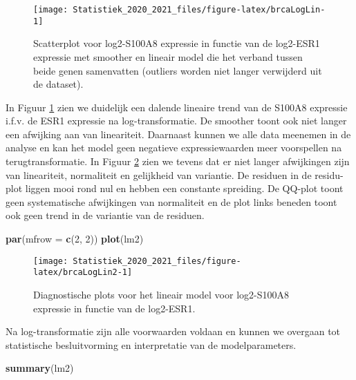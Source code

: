 \documentclass[
  12pt,dutch,coursenotes]{book}
\newenvironment{Shaded}{\begin{snugshade}}{\end{snugshade}}
\newcommand{\DataTypeTok}[1]{\textcolor[rgb]{0.13,0.29,0.53}{#1}}
\newcommand{\DecValTok}[1]{\textcolor[rgb]{0.00,0.00,0.81}{#1}}
\newcommand{\KeywordTok}[1]{\textcolor[rgb]{0.13,0.29,0.53}{\textbf{#1}}}
\newcommand{\NormalTok}[1]{#1}
\theoremstyle{definition}
\theoremstyle{definition}
\theoremstyle{definition}
\theoremstyle{remark}
\begin{document}
\begin{figure}

{\centering \texttt{[image: Statistiek\_2020\_2021\_files/figure-latex/brcaLogLin-1]} 

}

\caption{Scatterplot voor log2-S100A8 expressie in functie van de log2-ESR1 expressie met smoother en lineair model die het verband tussen beide genen samenvatten (outliers worden niet langer verwijderd uit de dataset).}\label{fig:brcaLogLin}
\end{figure}

In Figuur \ref{fig:brcaLogLin} zien we duidelijk een dalende lineaire trend van de S100A8 expressie i.f.v. de ESR1 expressie na log-transformatie.
De smoother toont ook niet langer een afwijking aan van lineariteit.
Daarnaast kunnen we alle data meenemen in de analyse en kan het model geen negatieve expressiewaarden meer voorspellen na terugtransformatie.
In Figuur \ref{fig:brcaLogLin2} zien we tevens dat er niet langer afwijkingen zijn van lineariteit, normaliteit en gelijkheid van variantie.
De residuen in de residu-plot liggen mooi rond nul en hebben een constante spreiding.
De QQ-plot toont geen systematische afwijkingen van normaliteit en de plot links beneden toont ook geen trend in de variantie van de residuen.

\begin{Shaded}
\begin{Highlighting}[]
\KeywordTok{par}\NormalTok{(}\DataTypeTok{mfrow =} \KeywordTok{c}\NormalTok{(}\DecValTok{2}\NormalTok{, }\DecValTok{2}\NormalTok{))}
\KeywordTok{plot}\NormalTok{(lm2)}
\end{Highlighting}
\end{Shaded}

\begin{figure}

{\centering \texttt{[image: Statistiek\_2020\_2021\_files/figure-latex/brcaLogLin2-1]} 

}

\caption{Diagnostische plots voor het lineair model voor log2-S100A8 expressie in functie van de log2-ESR1.}\label{fig:brcaLogLin2}
\end{figure}

Na log-transformatie zijn alle voorwaarden voldaan en kunnen we overgaan tot statistische besluitvorming en interpretatie van de modelparameters.

\begin{Shaded}
\begin{Highlighting}[]
\KeywordTok{summary}\NormalTok{(lm2)}
\end{Highlighting}
\end{Shaded}
\end{document}
